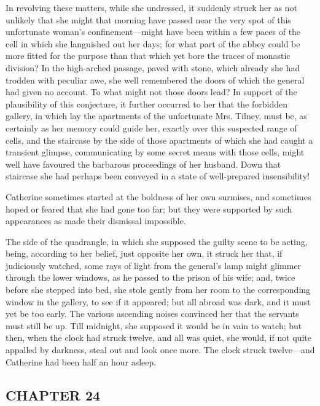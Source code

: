 In revolving these matters, while she undressed, it suddenly struck her as not unlikely that she might that morning have passed near the very spot of this unfortunate woman's confinement---might have been within a few paces of the cell in which she languished out her days; for what part of the abbey could be more fitted for the purpose than that which yet bore the traces of monastic division? In the high-arched passage, paved with stone, which already she had trodden with peculiar awe, she well remembered the doors of which the general had given no account. To what might not those doors lead? In support of the plausibility of this conjecture, it further occurred to her that the forbidden gallery, in which lay the apartments of the unfortunate Mrs. Tilney, must be, as certainly as her memory could guide her, exactly over this suspected range of cells, and the staircase by the side of those apartments of which she had caught a transient glimpse, communicating by some secret means with those cells, might well have favoured the barbarous proceedings of her husband. Down that staircase she had perhaps been conveyed in a state of well-prepared insensibility!

Catherine sometimes started at the boldness of her own surmises, and sometimes hoped or feared that she had gone too far; but they were supported by such appearances as made their dismissal impossible.

The side of the quadrangle, in which she supposed the guilty scene to be acting, being, according to her belief, just opposite her own, it struck her that, if judiciously watched, some rays of light from the general's lamp might glimmer through the lower windows, as he passed to the prison of his wife; and, twice before she stepped into bed, she stole gently from her room to the corresponding window in the gallery, to see if it appeared; but all abroad was dark, and it must yet be too early. The various ascending noises convinced her that the servants must still be up. Till midnight, she supposed it would be in vain to watch; but then, when the clock had struck twelve, and all was quiet, she would, if not quite appalled by darkness, steal out and look once more. The clock struck twelve---and Catherine had been half an hour asleep.

\subsection[chapter-24]{\useURL[url26][][][]\from[url26]CHAPTER 24}

